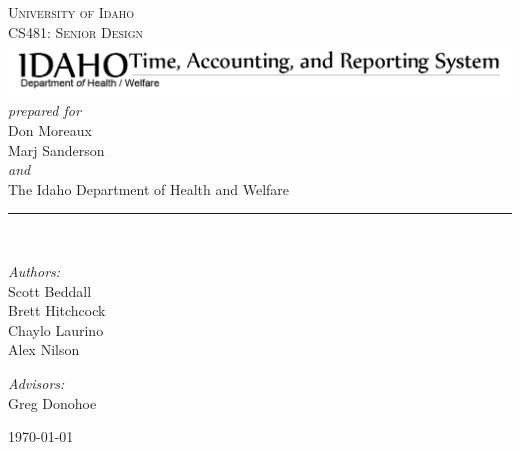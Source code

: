 \documentclass[letterpaper]{article}
\newcommand{\HRule}{\rule{5cm}{0.1mm}}
\begin{document}
\begin{center}



\textsc{\Large University of Idaho}\\[0.2cm]

\textsc{\Large CS481: Senior Design}\\[2cm]


{ \includegraphics[scale=0.45]{logo_huge_inverse.png} }\\[2.0cm]
{ \normalsize \emph{ prepared for}}\\[0.5cm]
{ \normalsize Don Moreaux}\\
{ \normalsize Marj Sanderson}\\[0.5cm]
{ \small \emph{and}}\\[0.5cm]
{ \normalsize The Idaho Department of Health and Welfare}\\[0.5cm]
\HRule \\[3cm]

\begin{minipage}{0.4\textwidth}
\begin{flushleft} \large
\emph{Authors:}\\
Scott Beddall\\
Brett Hitchcock\\
Chaylo Laurino\\
Alex Nilson
\end{flushleft}
\end{minipage}
\begin{minipage}{0.4\textwidth}
\begin{flushright} \large
\emph{Advisors:} \\
Greg Donohoe\\
\bigskip
\bigskip
\bigskip
\bigskip
\end{flushright}
\end{minipage}

{\large \today}

\end{center}
\pagebreak
\tableofcontents
\end{document}
